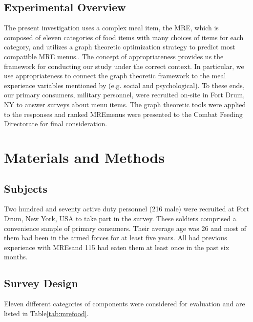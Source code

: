 \subsection{Experimental Overview}
The present investigation uses a complex meal item, the MRE\tm, which is composed of eleven categories of food items with many choices of items for each category, and utilizes a graph theoretic optimization strategy to predict most compatible MRE menus..  The concept of appropriateness \citep{Schutz1988} provides us the framework for conducting our study under the correct context.  In particular, we use appropriateness to connect the graph theoretic framework  to the meal experience variables mentioned by \citet{Meiselman2000} (e.g. social and psychological).  To these ends, our primary consumers, military personnel, were recruited on-site in Fort Drum, NY to answer surveys about menu items.  The graph theoretic tools were applied to the responses and ranked MRE\tm menus were presented to the Combat Feeding Directorate for final consideration.

\section{Materials and Methods}
\subsection{Subjects}
Two hundred and seventy active duty personnel (216 male) were recruited at Fort Drum, New York, USA to take part in the survey.  These soldiers comprised a convenience sample of primary consumers.  Their average age was 26 and most of them had been in the armed forces for at least five years.  All had previous experience with MREs\tm and 115 had eaten them at least once in the past six months.  

\subsection{Survey Design}
Eleven different categories of components were considered for evaluation and are listed in Table\ref{tab:mrefood}.

